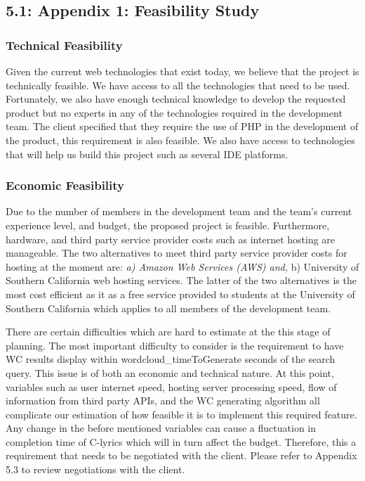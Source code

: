 \documentclass[]{article}
\begin{document}
\subsection{5.1: Appendix 1: Feasibility
Study}\label{appendix-1-feasibility-study}

\subsubsection{Technical Feasibility}\label{technical-feasibility}

Given the current web technologies that exist today, we believe that the
project is technically feasible. We have access to all the technologies
that need to be used. Fortunately, we also have enough technical
knowledge to develop the requested product but no experts in any of the
technologies required in the development team. The client specified that
they require the use of PHP in the development of the product, this
requirement is also feasible. We also have access to technologies that
will help us build this project such as several IDE platforms.

\subsubsection{Economic Feasibility}\label{economic-feasibility}

Due to the number of members in the development team and the team's
current experience level, and budget, the proposed project is feasible.
Furthermore, hardware, and third party service provider costs such as
internet hosting are manageable. The two alternatives to meet third
party service provider costs for hosting at the moment are: \emph{a)
Amazon Web Services (AWS) and, }b) University of Southern California web
hosting services. The latter of the two alternatives is the most cost
efficient as it as a free service provided to students at the University
of Southern California which applies to all members of the development
team.

There are certain difficulties which are hard to estimate at the this
stage of planning. The most important difficulty to consider is the
requirement to have WC results display within wordcloud\_timeToGenerate
seconds of the search query. This issue is of both an economic and
technical nature. At this point, variables such as user internet speed,
hosting server processing speed, flow of information from third party
APIs, and the WC generating algorithm all complicate our estimation of
how feasible it is to implement this required feature. Any change in the
before mentioned variables can cause a fluctuation in completion time of
C-lyrics which will in turn affect the budget. Therefore, this a
requirement that needs to be negotiated with the client. Please refer to
Appendix 5.3 to review negotiations with the client.
\end{document}
